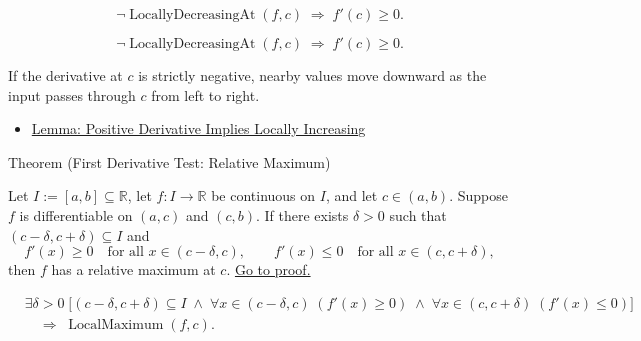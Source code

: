 \begin{remark*}
\[
\lnot\operatorname{LocallyDecreasingAt}(f,c) \;\Rightarrow\; f'(c) \geq 0.
\]
\end{remark*}

\begin{remark*}
\[
\lnot\operatorname{LocallyDecreasingAt}(f,c) \;\Rightarrow\; f'(c) \geq 0.
\]
\end{remark*}

\begin{remark*}[Interpretation]
If the derivative at $c$ is strictly negative, nearby values move downward as the input passes through $c$ from left to right.
\end{remark*}

\begin{dependencies}
\begin{itemize}
  \item \hyperref[lem:positive-derivative-implies-locally-increasing]{Lemma: Positive Derivative Implies Locally Increasing}
\end{itemize}
\end{dependencies}


\begin{theorembox}{Theorem (First Derivative Test: Relative Maximum)}
\begin{theorem}
\label{thm:first-derivative-test-maximum}
Let $I := [a,b] \subseteq \mathbb{R}$, let $f : I \to \mathbb{R}$ be continuous on $I$, and let $c \in (a,b)$. Suppose $f$ is differentiable on $(a,c)$ and $(c,b)$. If there exists $\delta > 0$ such that $(c-\delta,c+\delta) \subseteq I$ and
\[
f'(x) \geq 0 \quad \text{for all } x \in (c-\delta,c),
\qquad
f'(x) \leq 0 \quad \text{for all } x \in (c,c+\delta),
\]
then $f$ has a relative maximum at $c$.
\hyperref[prf:first-derivative-test-maximum]{Go to proof.}
\end{theorem}
\end{theorembox}

\begin{remark*}
\begin{align*}
&\exists \delta > 0\;\bigl[(c-\delta,c+\delta)\subseteq I
\;\land\;
\forall x\in(c-\delta,c)\;(f'(x)\geq 0)
\;\land\;
\forall x\in(c,c+\delta)\;(f'(x)\leq 0)\bigr]\\
&\quad\Rightarrow\; \operatorname{LocalMaximum}(f,c).
\end{align*}
\end{remark*}

